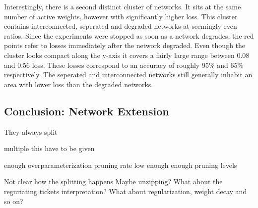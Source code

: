 Interestingly, there is a second distinct cluster of networks.
It sits at the same number of active weights, however with significantly higher loss.
This cluster contains interconnected, seperated and degraded networks at seemingly even ratios.
Since the experiments were stopped as soon as a network degrades, the red points refer to losses immediately after the network degraded.
Even though the cluster looks compact along the y-axis it covers a fairly large range between 0.08 and 0.56 loss. These losses correspond to an accuracy of roughly $95$\% and $65$\% respectively.
The seperated and interconnected networks still generally inhabit an area with lower loss than the degraded networks.


\subsection{Conclusion: Network Extension}
They always split

multiple this have to be given

enough overparameterization
pruning rate low enough
enough pruning levels

Not clear how the splitting happens
Maybe unzipping?
What about the reguriating tickets interpretation?
What about regularization, weight decay and so on?
